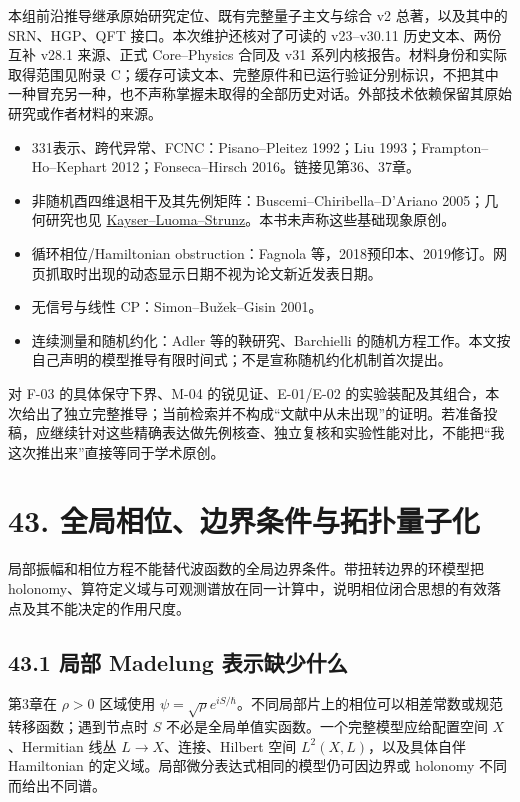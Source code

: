 \documentclass[
  11pt,
  oneside]{book}
\providecommand{\tightlist}{%
  \setlength{\itemsep}{0pt}\setlength{\parskip}{0pt}}
\begin{document}
本组前沿推导继承原始研究定位、既有完整量子主文与综合 v2 总著，以及其中的
SRN、HGP、QFT 接口。本次维护还核对了可读的 v23--v30.11
历史文本、两份互补 v28.1 来源、正式 Core--Physics 合同及 v31
系列内核报告。材料身份和实际取得范围见附录
C；缓存可读文本、完整原件和已运行验证分别标识，不把其中一种冒充另一种，也不声称掌握未取得的全部历史对话。外部技术依赖保留其原始研究或作者材料的来源。

\begin{itemize}
\tightlist
\item
  331表示、跨代异常、FCNC：Pisano--Pleitez 1992；Liu
  1993；Frampton--Ho--Kephart 2012；Fonseca--Hirsch
  2016。链接见第36、37章。
\item
  非随机酉四维退相干及其先例矩阵：Buscemi--Chiribella--D'Ariano
  2005；几何研究也见
  \href{https://arxiv.org/abs/1508.04027}{Kayser--Luoma--Strunz}。本书未声称这些基础现象原创。
\item
  循环相位/Hamiltonian obstruction：Fagnola
  等，2018预印本、2019修订。网页抓取时出现的动态显示日期不视为论文新近发表日期。
\item
  无信号与线性 CP：Simon--Bužek--Gisin 2001。
\item
  连续测量和随机约化：Adler 等的鞅研究、Barchielli
  的随机方程工作。本文按自己声明的模型推导有限时间式；不是宣称随机约化机制首次提出。
\end{itemize}

对 F-03 的具体保守下界、M-04 的锐见证、E-01/E-02
的实验装配及其组合，本次给出了独立完整推导；当前检索并不构成``文献中从未出现''的证明。若准备投稿，应继续针对这些精确表达做先例核查、独立复核和实验性能对比，不能把``我这次推出来''直接等同于学术原创。

\chapter{43. 全局相位、边界条件与拓扑量子化}\label{ch-43}\hypertarget{ch-43}{}

局部振幅和相位方程不能替代波函数的全局边界条件。带扭转边界的环模型把
holonomy、算符定义域与可观测谱放在同一计算中，说明相位闭合思想的有效落点及其不能决定的作用尺度。

\section{43.1 局部 Madelung 表示缺少什么}

第3章在 \(\rho>0\) 区域使用
\(\psi=\sqrt\rho e^{iS/\hbar}\)。不同局部片上的相位可以相差常数或规范转移函数；遇到节点时
\(S\) 不必是全局单值实函数。一个完整模型应给配置空间 \(X\)、Hermitian
线丛 \(L\to X\)、连接、Hilbert 空间 \(L^2(X,L)\)，以及具体自伴
Hamiltonian 的定义域。局部微分表达式相同的模型仍可因边界或 holonomy
不同而给出不同谱。
\end{document}
